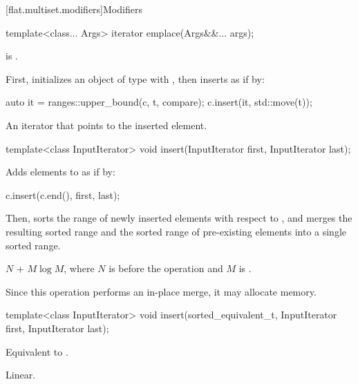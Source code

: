 [flat.multiset.modifiers]{Modifiers}

%
\begin{itemdecl}
template<class... Args> iterator emplace(Args&&... args);
\end{itemdecl}

\begin{itemdescr}
\pnum
\constraints
{} is .

\pnum
\effects
First, initializes an object  of type 
with ,
then inserts  as if by:
\begin{codeblock}
auto it = ranges::upper_bound(c, t, compare);
c.insert(it, std::move(t));
\end{codeblock}

\pnum
\returns
An iterator that points to the inserted element.
\end{itemdescr}

%
\begin{itemdecl}
template<class InputIterator>
  void insert(InputIterator first, InputIterator last);
\end{itemdecl}

\begin{itemdescr}
\pnum
\effects
Adds elements to  as if by:
\begin{codeblock}
c.insert(c.end(), first, last);
\end{codeblock}
Then, sorts the range of newly inserted elements with respect to ,
and merges the resulting sorted range and
the sorted range of pre-existing elements into a single sorted range.

\pnum
\complexity
$N$ + $M \log M$, where $N$ is  before the operation and $M$
is .

\pnum
\remarks
Since this operation performs an in-place merge, it may allocate memory.
\end{itemdescr}

%
\begin{itemdecl}
template<class InputIterator>
  void insert(sorted_equivalent_t, InputIterator first, InputIterator last);
\end{itemdecl}

\begin{itemdescr}
\pnum
\effects
Equivalent to .

\pnum
\complexity
Linear.
\end{itemdescr}

